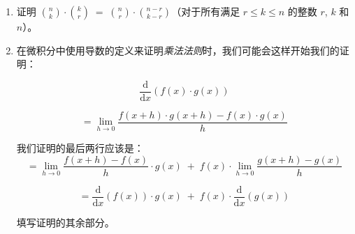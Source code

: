 \begin{enumerate}
    \wbvfill
    
    \workbookpagebreak
    
    \item 
    证明 $\binom{n}{k} \cdot \binom{k}{r} \; = \; \binom{n}{r} \cdot \binom{n-r}{k-r}$（对于所有满足 $r \leq k \leq n$ 的整数 $r$, $k$ 和 $n$）。
    
    \wbvfill
    
    \workbookpagebreak
    
    \item 
    在微积分中使用导数的定义来证明\emph{乘法法则}时，我们可能会这样开始我们的证明：
    
    \[
    \frac{\mbox{d}}{\mbox{d}x} \left( f(x) \cdot g(x) \right)
    \]
    
    \[ = \lim_{h \longrightarrow 0} \frac{f(x+h) \cdot g(x+h) - f(x) \cdot g(x)}{h} \]
        
    \noindent 我们证明的最后两行应该是：
    \[
    = \lim_{h \longrightarrow 0} \frac{f(x+h) - f(x)}{h} \cdot g(x) \; + \; f(x) \cdot \lim_{h \longrightarrow 0} \frac{g(x+h) - g(x)}{h}
    \]
    
    \[
    = \frac{\mbox{d}}{\mbox{d}x}\left( f(x) \right) \cdot g(x) \; + \; f(x) \cdot \frac{\mbox{d}}{\mbox{d}x}\left( g(x) \right) 
    \]
    
    
    填写证明的其余部分。
    
    \wbvfill
    
    \workbookpagebreak
    
    \end{enumerate}